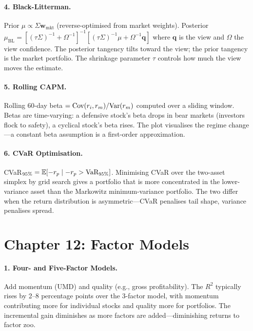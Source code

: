 \paragraph{4. Black-Litterman.}
Prior $\mu \propto \Sigma \mathbf{w}_{\text{mkt}}$ (reverse-optimised
from market weights). Posterior $\mu_{\text{BL}} = [(\tau\Sigma)^{-1}
+ \Omega^{-1}]^{-1} [(\tau\Sigma)^{-1}\mu + \Omega^{-1}\mathbf{q}]$
where $\mathbf{q}$ is the view and $\Omega$ the view confidence. The
posterior tangency tilts toward the view; the prior tangency is the
market portfolio. The shrinkage parameter $\tau$ controls how much
the view moves the estimate.

\paragraph{5. Rolling CAPM.}
Rolling 60-day beta $= \text{Cov}(r_i, r_m) / \text{Var}(r_m)$ computed over a
sliding window. Betas are time-varying: a defensive stock's beta
drops in bear markets (investors flock to safety), a cyclical
stock's beta rises. The plot visualises the regime change---a
constant beta assumption is a first-order approximation.

\paragraph{6. CVaR Optimisation.}
CVaR$_{95\%} = \mathbb{E}[-r_p \mid -r_p > \text{VaR}_{95\%}]$. Minimising
CVaR over the two-asset simplex by grid search gives a portfolio
that is more concentrated in the lower-variance asset than the
Markowitz minimum-variance portfolio. The two differ when the return
distribution is asymmetric---CVaR penalises tail shape, variance
penalises spread.

\section*{Chapter 12: Factor Models}

\paragraph{1. Four- and Five-Factor Models.}
Add momentum (UMD) and quality (e.g., gross profitability). The
$R^2$ typically rises by 2--8 percentage points over the 3-factor
model, with momentum contributing more for individual stocks and
quality more for portfolios. The incremental gain diminishes as more
factors are added---diminishing returns to factor zoo.

